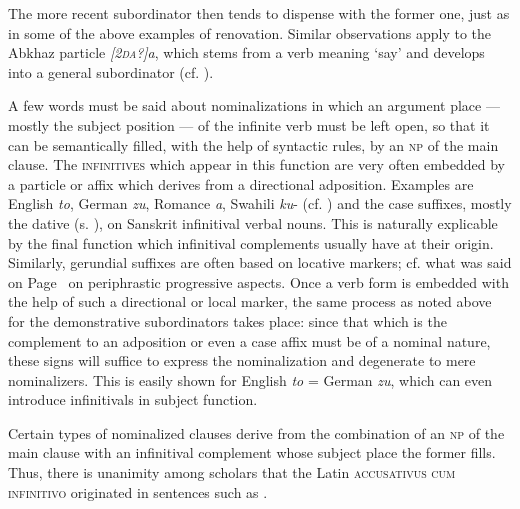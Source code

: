 \noindent The more recent subordinator then tends to dispense with the former one, just as in some of the above examples of renovation. Similar observations apply to the Abkhaz particle \textit{[2\textsc{da}?]a}, which stems from a verb meaning ‘say’ and develops into a general subordinator (cf. \citealt[5--8, 28--35, 43]{Hewitt1979}).

A few words must be said about nominalizations in which an argument place — mostly the subject position — of the infinite verb must be left open, so that it can be semantically filled, with the help of syntactic rules, by an \textsc{np} of the main clause. The \textsc{infinitives} which appear in this function are very often embedded by a particle or affix which derives from a directional adposition. Examples are English \textit{to}, German \textit{zu}, Romance \textit{a}, Swahili \textit{ku}{}- (cf. \citealt{Meinhof1936}) and the case suffixes, mostly the dative (s. \citealt[298]{Szemerényi1970}), on Sanskrit infinitival verbal nouns. This is naturally explicable by the final function which infinitival complements usually have at their origin. Similarly, gerundial suffixes are often based on locative markers; cf. what was said on Page~\pageref{page33}\chk%
  on periphrastic progressive aspects. Once a verb form is embedded with the help of such a directional or local marker, the same process as noted above for the demonstrative subordinators takes place: since that which is the complement to an adposition or even a case affix must be of a nominal nature, these signs will suffice to express the nominalization and degenerate to mere nominalizers. This is easily shown for English \textit{to} = German \textit{zu}, which can even introduce infinitivals in subject function.

Certain types of nominalized clauses derive from the combination of an \textsc{np} of the main clause with an infinitival complement whose subject place the former fills. Thus, there is unanimity among scholars that the Latin \textsc{accusativus cum infinitivo} originated in sentences such as .

